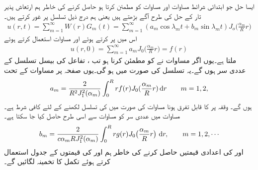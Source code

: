  \quad ایسا حل جو ابتدائی شرائط مساوات  اور مساوات  کو مطمئن کرتا ہو حاصل کرنے کی خاطر ہم ارتعاش پذیر تار کے حل کی طرح آگے بڑھتے ہیں یعنی ہم درج ذیل تسلسل پر غور کرتے ہیں۔
\begin{align}\label{مساوات_جزوی_دائری_حل_ٹ}
u(r,t)=\sum_{m=1}^{\infty} W(r)G_m(t)=\sum_{m=1}^{\infty} (a_m\cos\lambda_mt+b_m\sin\lambda_mt)J_o\big(\frac{\alpha_m}{R}r\big)
\end{align}
اس میں  پر کرتے ہوئے  اور مساوات  استعمال کرتے ہوئے 
\begin{align}\label{مساوات_جزوی_دائری_حل_ث}
u(r,0)=\sum_{m=1}^{\infty} a_mJ_0\big(\frac{\alpha_m}{R}r\big)=f(r)
\end{align}
ملتا ہے۔یوں اگر مساوات  نے  کو مطمئن کرنا ہو تب ، تفاعل  کی بیسل تسلسل  کے عددی سر ہوں گے۔یہ تسلسل  کی صورت میں ہو گی۔یوں صفحہ  پر مساوات  کے تحت
\begin{align}\label{مساوات_جزوی_دائری_حل_ج}
a_m=\frac{2}{R^2J^2_1(\alpha_{m})}\int_0^R rf(r)J_0(\frac{\alpha_m}{R}r)\dif r\quad \quad m=1,2,
\end{align}
ہوں گے۔ وقفہ  پر  کا قابل تفرق ہونا مساوات  کی صورت میں  کی تسلسل لکھنے کے لئے کافی شرط ہے۔مساوات  میں عددی سر  کو مساوات  سے اسی طرح  حاصل کیا جا سکتا ہے۔
\begin{align}\label{مساوات_جزوی_دائری_حل_چ}
b_m=\frac{2}{c\alpha_m RJ_1^2(\alpha_m)}\int_0^R rg(r)J_0\big(\frac{\alpha_m}{R}r\big)\,\dif r,\quad \quad m=1,2,\cdots
\end{align}
 اور  کی اعدادی قیمتیں حاصل کرنے کی خاطر ہم  اور  کی قیمتوں کے جدول استعمال کرتے ہوئے تکمل کا تخمینہ لگائیں گے۔


